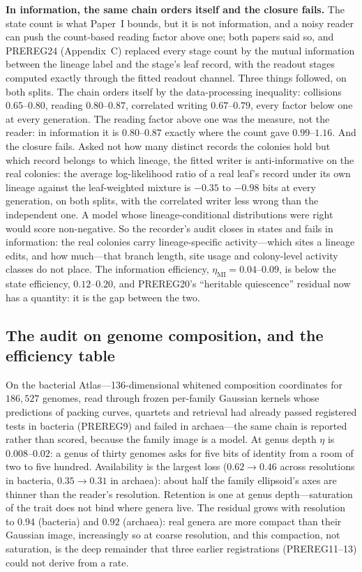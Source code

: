 \documentclass[11pt]{article}
\begin{document}
\medskip
\noindent\textbf{In information, the same chain orders itself and the closure fails.} The state count is what Paper~I bounds, but it is not information, and a noisy reader can push the count-based reading factor above one; both papers said so, and PREREG24 (Appendix~C) replaced every stage count by the mutual information between the lineage label and the stage's leaf record, with the readout stages computed exactly through the fitted readout channel. Three things followed, on both splits. The chain orders itself by the data-processing inequality: collisions $0.65$--$0.80$, reading $0.80$--$0.87$, correlated writing $0.67$--$0.79$, every factor below one at every generation. The reading factor above one was the measure, not the reader: in information it is $0.80$--$0.87$ exactly where the count gave $0.99$--$1.16$. And the closure fails. Asked not how many distinct records the colonies hold but which record belongs to which lineage, the fitted writer is anti-informative on the real colonies: the average log-likelihood ratio of a real leaf's record under its own lineage against the leaf-weighted mixture is $-0.35$ to $-0.98$ bits at every generation, on both splits, with the correlated writer less wrong than the independent one. A model whose lineage-conditional distributions were right would score non-negative. So the recorder's audit closes in states and fails in information: the real colonies carry lineage-specific activity---which sites a lineage edits, and how much---that branch length, site usage and colony-level activity classes do not place. The information efficiency, $\eta_{\mathrm{MI}}=0.04$--$0.09$, is below the state efficiency, $0.12$--$0.20$, and PREREG20's ``heritable quiescence'' residual now has a quantity: it is the gap between the two.

\subsection{The audit on genome composition, and the efficiency table}

On the bacterial Atlas---136-dimensional whitened composition coordinates for $186{,}527$ genomes, read through frozen per-family Gaussian kernels whose predictions of packing curves, quartets and retrieval had already passed registered tests in bacteria (PREREG9) and failed in archaea---the same chain is reported rather than scored, because the family image is a model. At genus depth $\eta$ is $0.008$--$0.02$: a genus of thirty genomes asks for five bits of identity from a room of two to five hundred. Availability is the largest loss ($0.62\to0.46$ across resolutions in bacteria, $0.35\to0.31$ in archaea): about half the family ellipsoid's axes are thinner than the reader's resolution. Retention is one at genus depth---saturation of the trait does not bind where genera live. The residual grows with resolution to $0.94$ (bacteria) and $0.92$ (archaea): real genera are more compact than their Gaussian image, increasingly so at coarse resolution, and this compaction, not saturation, is the deep remainder that three earlier registrations (PREREG11--13) could not derive from a rate.
\end{document}
